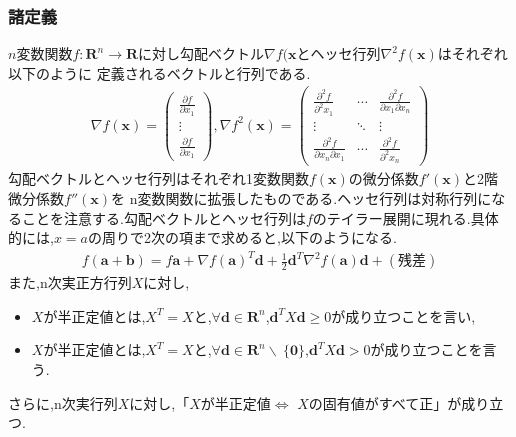 \documentclass[12pt]{jarticle}
\begin{document}
\subsubsection{諸定義}
$n$変数関数$f:\boldsymbol{R}^n \rightarrow \boldsymbol{R}$に対し勾配ベクトル$\nabla f(\boldsymbol{x}$とヘッセ行列$\nabla^2f(\boldsymbol{x})$はそれぞれ以下のように
定義されるベクトルと行列である.
\begin{eqnarray}
    \nabla f(\boldsymbol{x})=\left(\begin{array}{r}
        \frac{\partial f}{\partial x_1}\\
         \vdots \\
        \frac{\partial f}{\partial x_1}
    \end{array}\right),
    \nabla f^2(\boldsymbol{x})=\left(\begin{array}{rrr}
        \frac{\partial^2f}{\partial^2x_1}&\cdots&\frac{\partial^2f}{\partial x_1\partial x_n}\\
         \vdots &\ddots & \vdots \\
        \frac{\partial^2f}{\partial x_n\partial x_1}&\cdots&\frac{\partial^2f}{\partial^2x_n}   
    \end{array}\right)\nonumber
\end{eqnarray}
勾配ベクトルとヘッセ行列はそれぞれ1変数関数$f(\boldsymbol{x})$の微分係数$f'(\boldsymbol{x})$と2階微分係数$f''(\boldsymbol{x})$を
n変数関数に拡張したものである.ヘッセ行列は対称行列になることを注意する.勾配ベクトルとヘッセ行列は$f$のテイラー展開に現れる.具体的には,$x=a$の周りで2次の項まで求めると,以下のようになる.
\begin{eqnarray}
    f(\boldsymbol{a}+\boldsymbol{b})=f{\boldsymbol{a}}+\nabla f(\boldsymbol{a})^T\boldsymbol{d}+\frac{1}{2}\boldsymbol{d}^T\nabla^2f(\boldsymbol{a})\boldsymbol{d}+(残差)\nonumber
\end{eqnarray}
また,n次実正方行列$X$に対し,
\begin{itemize}
    \item $X$が半正定値とは,$X^T=X$と,$\forall\boldsymbol{d}\in\boldsymbol{R}^n$,$\boldsymbol{d}^TX\boldsymbol{d}\geq 0$が成り立つことを言い,
    \item $X$が半正定値とは,$X^T=X$と,$\forall\boldsymbol{d}\in\boldsymbol{R}^n\backslash \ \{\boldsymbol{0}\}$,$\boldsymbol{d}^TX\boldsymbol{d}> 0$が成り立つことを言う.
\end{itemize}
さらに,n次実行列$X$に対し,「$X$が半正定値$\Leftrightarrow$ $X$の固有値がすべて正」が成り立つ.
\end{document}
